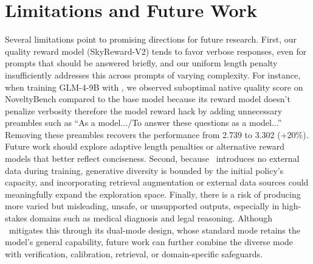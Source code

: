 \section{Limitations and Future Work}
\label{appx:limitations}
Several limitations point to promising directions for future research. First, our quality reward model (SkyReward-V2) tends to favor verbose responses, even for prompts that should be answered briefly, and our uniform length penalty insufficiently addresses this across prompts of varying complexity. For instance, when training GLM-4-9B with \method, we observed suboptimal native quality score on NoveltyBench compared to the base model because its reward model doesn't penalize verbosity therefore the model reward hack by adding unnecessary preambles such as ``As a model.../To answer these questions as a model...'' Removing these preambles  recovers the performance from 2.739 to 3.302 (+20\%). Future work should explore adaptive length penalties or alternative reward models that better reflect conciseness. Second, because \method~introduces no external data during training, generative diversity is bounded by the initial policy's capacity, and incorporating retrieval augmentation or external data sources could meaningfully expand the exploration space. Finally, there is a risk of producing more varied but misleading, unsafe, or unsupported outputs, especially in high-stakes domains such as medical diagnosis and legal reasoning. Although \method~mitigates this through its dual-mode design, whose standard mode retains the model's general capability, future work can further combine the diverse mode with verification, calibration, retrieval, or domain-specific safeguards.